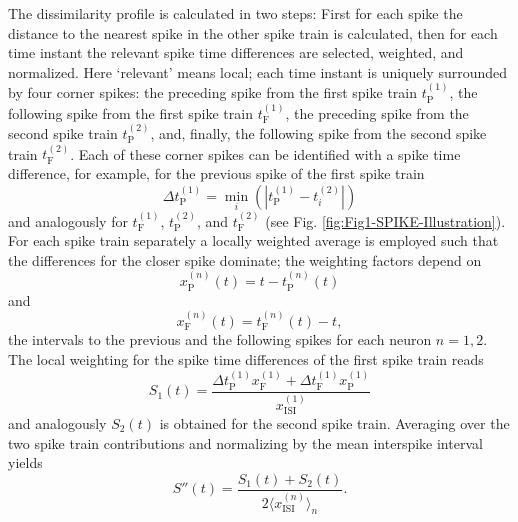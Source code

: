 \documentclass[10pt,twocolumn]{elsart5p}
\begin{document}
The dissimilarity profile is calculated in two steps: First for each spike the distance to the nearest spike in the other spike train is calculated, then for each time instant the relevant spike time differences are selected, weighted, and normalized. Here `relevant' means local; each time instant is uniquely surrounded by four corner spikes: the preceding spike from the first spike train $t_{\mathrm {P}}^{(1)}$, the following spike from the first spike train $t_{\mathrm {F}}^{(1)}$, the preceding spike from the second spike train $t_{\mathrm {P}}^{(2)}$, and, finally, the following spike from the second spike train $t_{\mathrm {F}}^{(2)}$. Each of these corner spikes can be identified with a spike time difference, for example, for the previous spike of the first spike train
%
\begin{equation} \label{eq:Delta-Corner-Spike}
     \Delta t_{\mathrm {P}}^{(1)} = \min_i (| t_{\mathrm {P}}^{(1)} - t_i^{(2)} |)
\end{equation}
%
and analogously for $t_{\mathrm {F}}^{(1)}$, $t_{\mathrm {P}}^{(2)}$, and $t_{\mathrm {F}}^{(2)}$  (see Fig. \ref{fig:Fig1-SPIKE-Illustration}). For each spike train separately a locally weighted average is employed such that the differences for the closer spike dominate; the weighting factors depend on
%
\begin{equation} \label{eq:Prev-Spike-Dist}
     x_{\mathrm {P}}^{(n)} (t) = t - t_{\mathrm {P}}^{(n)} (t)
\end{equation}
%
and
%
\begin{equation} \label{eq:Foll-Spike-Dist}
     x_{\mathrm {F}}^{(n)} (t) = t_{\mathrm {F}}^{(n)} (t) - t,
\end{equation}
%
the intervals to the previous and the following spikes for each neuron $n = 1, 2$. The local weighting for the spike time differences of the first spike train reads
%
\begin{equation} \label{eq:Bi-Spike-Diss-First}
     S_1 (t) = \frac{\Delta t_{\mathrm {P}}^{(1)} x_{\mathrm {F}}^{(1)} + \Delta t_{\mathrm {F}}^{(1)} x_{\mathrm {P}}^{(1)}}{x_{\mathrm {ISI}}^{(1)}}
\end{equation}
%
and analogously $S_2 (t)$ is obtained for the second spike train. Averaging over the two spike train contributions and normalizing by the mean interspike interval yields
%
\begin{equation} \label{eq:Bi-Spike-Diss-Intermediate}
     S'' (t) = \frac{S_1 (t) + S_2 (t)}{2 \langle x_{\mathrm {ISI}}^{(n)} \rangle_n}.
\end{equation}
\end{document}
